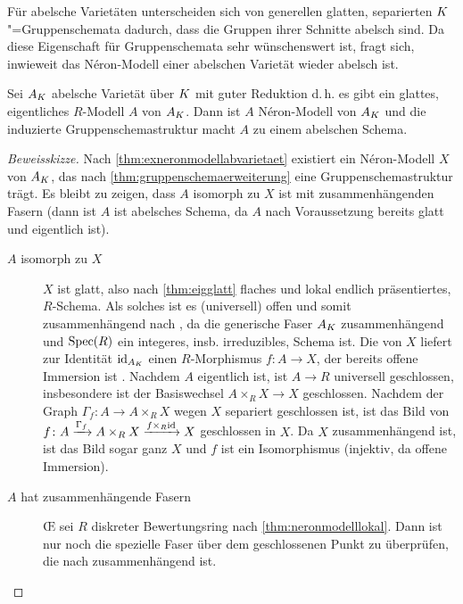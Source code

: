 \documentclass[german, bibliography=totoc]{scrreprt}
\begin{document}
Für abelsche Varietäten unterscheiden sich von generellen glatten,
separierten $K$"=Gruppenschemata dadurch, dass die Gruppen ihrer
Schnitte abelsch sind. Da diese Eigenschaft für Gruppenschemata
sehr wünschenswert ist, fragt sich, inwieweit das Néron-Modell einer
abelschen Varietät wieder abelsch ist.
\begin{Satz}
  \label{thm:abelscheneronmodelle}
  Sei $A_{K}$ abelsche Varietät über $K$ mit guter Reduktion
  d.\,h. es gibt ein glattes, eigentliches $R$-Modell $A$ von $A_{K}$.
  Dann ist $A$ Néron-Modell von $A_{K}$ und die induzierte
  Gruppenschemastruktur macht $A$ zu einem abelschen Schema.
  \begin{proof}[Beweisskizze]
    Nach \ref{thm:exneronmodellabvarietaet} existiert ein
    Néron-Modell $X$ von $A_{K}$, das nach
    \ref{thm:gruppenschemaerweiterung} eine Gruppenschemastruktur
    trägt.
    Es bleibt zu zeigen, dass $A$ isomorph zu $X$ ist
    mit zusammenhängenden Fasern (dann ist $A$ ist abelsches Schema,
    da $A$ nach Voraussetzung bereits glatt und eigentlich ist).
    \begin{description}
    \item[$A$ isomorph zu $X$] $X$ ist glatt, also nach
      \ref{thm:eigglatt} flaches und lokal endlich
      präsentiertes, $R$-Schema.
      Als solches ist es (universell) offen \cite[Theorem 14.33]{wedhorn}
      und somit zusammenhängend nach \cite[Proposition 3.24]{wedhorn},
      da die generische Faser $A_{K}$ zusammenhängend und $\operatorname{Spec}(R)$
      ein integeres, insb. irreduzibles, Schema ist.
      Die \NAbbEig von $X$ liefert zur Identität $\mathrm{id}_{A_{K}}$ einen
      $R$-Morphismus $f\colon A\to X$, der bereits offene Immersion ist
      \cite[4.3/1 (ii) oder 4.4/1]{neron}.
      Nachdem $A$ eigentlich ist, ist $A\to R$ universell geschlossen,
      insbesondere ist der Basiswechsel $A\times_R X\to X$ geschlossen.
      Nachdem der Graph $\Gamma_f\colon A\to A\times_R X$ wegen $X$
      separiert geschlossen ist, ist das Bild von
      $f\colon A\xrightarrow{\Gamma_f} A\times_R X\xrightarrow{f\times_R\mathrm{id}} X$
      geschlossen in $X$.
      Da $X$ zusammenhängend ist, ist das Bild sogar ganz $X$ und $f$
      ist ein Isomorphismus (injektiv, da offene Immersion).
    \item[$A$ hat zusammenhängende Fasern]
      \OE{} sei $R$ diskreter Bewertungsring nach
      \ref{thm:neronmodelllokal}.
      Dann ist nur noch die spezielle Faser über dem geschlossenen
      Punkt zu überprüfen, die nach \cite[5.5.1]{EGAIII-1} zusammenhängend
      ist.
    \end{description}
  \end{proof}
\end{Satz}
\end{document}
